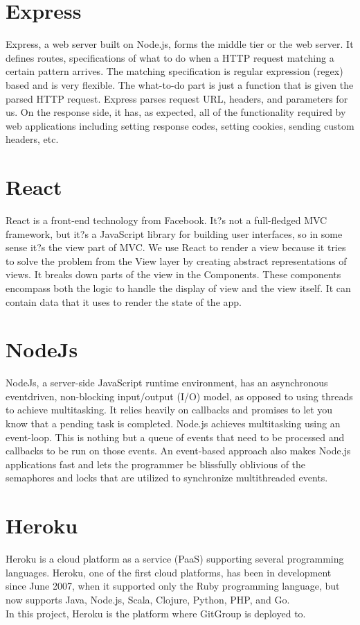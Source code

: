 \documentclass[12pt,a4paper]{report}
\begin{document}
\section{Express}
Express, \cite{wiki:express} a web server built on Node.js, forms the middle tier or the web server. It defines routes, specifications of what to do when a HTTP request matching a certain pattern arrives. The matching specification is regular expression (regex) based and is very flexible. The what-to-do part is just a function that is given the parsed HTTP request. Express parses request URL, headers, and parameters for us. On the response side, it has, as expected, all of the functionality required by web applications including setting response codes, setting cookies, sending custom headers, etc.  
\section{React}
React \cite{wiki:reactjs} is a front-end technology from Facebook. It?s not a full-fledged MVC framework, but it?s a JavaScript library for building user interfaces, so in some sense it?s the view part of MVC. We use React to render a view because it tries to solve the problem from the View layer by creating abstract representations of views. It breaks down parts of the view in the Components. These components encompass both the logic to handle the display of view and the view itself. It can contain data that it uses to render the state of the app. 
\section{NodeJs}
NodeJs, \cite{wiki:nodejs} a server-side JavaScript runtime environment, has an asynchronous eventdriven, non-blocking input/output (I/O) model, as opposed to using threads to achieve multitasking. It relies heavily on callbacks and promises to let you know that a pending task is completed. Node.js achieves multitasking using an event-loop. This is nothing but a queue of events that need to be processed and callbacks to be run on those events. An event-based approach also makes Node.js applications fast and lets the programmer be blissfully oblivious of the semaphores and locks that are utilized to synchronize multithreaded events.  
\section{Heroku}
Heroku \cite{wiki:heroku} is a cloud platform as a service (PaaS) supporting several programming languages. Heroku, one of the first cloud platforms, has been in development since June 2007, when it supported only the Ruby programming language, but now supports Java, Node.js, Scala, Clojure, Python, PHP, and Go.\\
In this project, Heroku is the platform where GitGroup is deployed to.
\end{document}
